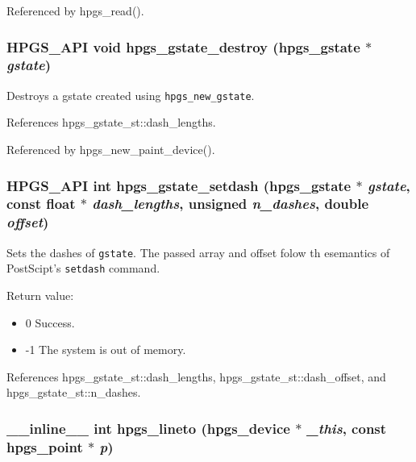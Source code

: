 Referenced by hpgs\_\-read().
\subsubsection[hpgs\_\-gstate\_\-destroy]{\setlength{\rightskip}{0pt plus 5cm}HPGS\_\-API void hpgs\_\-gstate\_\-destroy ({\bf hpgs\_\-gstate} $\ast$ {\em gstate})}\label{group__device_g3a2f449b7ae7de3e4ef9a6afac3b526c}


Destroys a gstate created using {\tt hpgs\_\-new\_\-gstate}. 

References hpgs\_\-gstate\_\-st::dash\_\-lengths.

Referenced by hpgs\_\-new\_\-paint\_\-device().
\subsubsection[hpgs\_\-gstate\_\-setdash]{\setlength{\rightskip}{0pt plus 5cm}HPGS\_\-API int hpgs\_\-gstate\_\-setdash ({\bf hpgs\_\-gstate} $\ast$ {\em gstate}, \/  const float $\ast$ {\em dash\_\-lengths}, \/  unsigned {\em n\_\-dashes}, \/  double {\em offset})}\label{group__device_g3d87c749cf3c6ade663c6319e11a33ce}


Sets the dashes of {\tt gstate}. The passed array and offset folow th esemantics of PostScipt's {\tt setdash} command.

Return value: \begin{itemize}
\item 0 Success. \item -1 The system is out of memory. \end{itemize}


References hpgs\_\-gstate\_\-st::dash\_\-lengths, hpgs\_\-gstate\_\-st::dash\_\-offset, and hpgs\_\-gstate\_\-st::n\_\-dashes.
\subsubsection[hpgs\_\-lineto]{\setlength{\rightskip}{0pt plus 5cm}\_\-\_\-inline\_\-\_\- int hpgs\_\-lineto ({\bf hpgs\_\-device} $\ast$ {\em \_\-this}, \/  const {\bf hpgs\_\-point} $\ast$ {\em p})\hspace{0.3cm}{\tt  [static]}}\label{group__device_g12162918d937d3248c8b28d505fb7d04}


